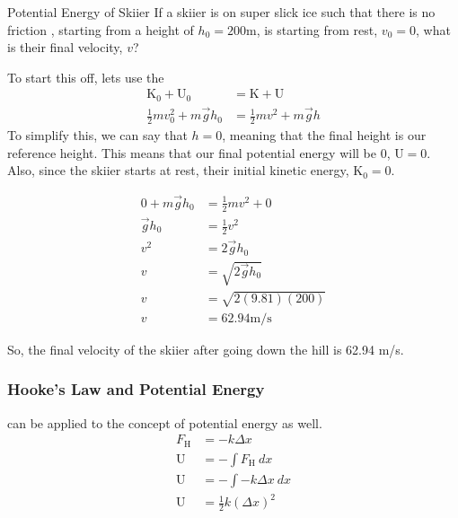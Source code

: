 \begin{example}[]{Potential Energy of Skiier}
  If a skiier is on super slick ice such that there is no friction , starting from a height of $h_{0}=200 \si{\meter}$, is starting from rest, $v_{0} = 0$, what is their final velocity, $v$?

  \tcblower

  To start this off, lets use the 
  \begin{align*}
    \text{K}_{0} + \text{U}_{0} &= \text{K} + \text{U} \\
    \frac{1}{2} m v_{0}^{2} + m \vec{g} h_{0} &= \frac{1}{2} m v^{2} + m \vec{g} h
  \end{align*}
  To simplify this, we can say that $h=0$, meaning that the final height is our reference height.
  This means that our final potential energy will be 0, $\text{U} = 0$.
  Also, since the skiier starts at rest, their initial kinetic energy, $\text{K}_{0} = 0$.

  \begin{align*}
    0 + m \vec{g} h_{0} &= \frac{1}{2} m v^{2} + 0 \\
    \vec{g} h_{0} &= \frac{1}{2} v^{2} \\
    v^{2} &= 2 \vec{g} h_{0} \\
    v &= \sqrt{2 \vec{g} h_{0}} \\
    v &= \sqrt{2 (9.81) (200)} \\
    v &= 62.94 \si{\meter / \second}
  \end{align*}

  So, the final velocity of the skiier after going down the hill is 62.94 \si{\meter / \second}.
\end{example}

\subsubsection{Hooke's Law and Potential Energy} \label{subsubsec:Hookes Law and Potential Energy}
 can be applied to the concept of potential energy as well.
\begin{align*}
  F_{\text{H}} &= -k \Delta x \\
  \text{U} &= - \int F_{\text{H}} \: dx \\
  \text{U} &= - \int -k \Delta x \: dx \\
  \text{U} &= \frac{1}{2} k \left( \Delta x \right)^{2}
\end{align*}


